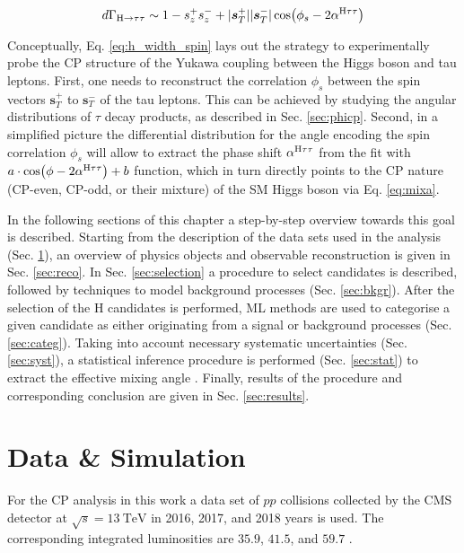 \begin{equation}\label{eq:h_width_spin}
    d\Gamma_{\text{H} \rightarrow \tau\tau} \sim 1 - s^+_zs^-_z + |\boldsymbol{s}_T^+||\boldsymbol{s}_T^-|\cos(\phi_{s}-2\alpha^{\text{H}\tau\tau})
\end{equation}

Conceptually, Eq. \ref{eq:h_width_spin} lays out the strategy to experimentally probe the CP structure of the Yukawa coupling between the Higgs boson and tau leptons. First, one needs to reconstruct the correlation $\phi_{s}$ between the spin vectors $\boldsymbol{s}_T^+$ to $\boldsymbol{s}_T^-$ of the tau leptons. This can be achieved by studying the angular distributions of $\tau$ decay products, as described in Sec. \ref{sec:phicp}. Second, in a simplified picture the differential distribution for the angle encoding the spin correlation $\phi_{s}$ will allow to extract the phase shift $\alpha^{\text{H}\tau\tau}$ from the fit with $a\cdot\cos(\phi - 2\alpha^{\text{H}\tau\tau})+b$ function, which in turn directly points to the CP nature (CP-even, CP-odd, or their mixture) of the SM Higgs boson via Eq. \ref{eq:mixa}. 

In the following sections of this chapter a step-by-step overview towards this goal is described. Starting from the description of the data sets used in the analysis (Sec. \ref{sec:samples}), an overview of physics objects and observable reconstruction is given in Sec. \ref{sec:reco}. In Sec. \ref{sec:selection} a procedure to select \htt candidates is described, followed by techniques to model background processes (Sec. \ref{sec:bkgr}). After the selection of the H candidates is performed, ML methods are used to categorise a given candidate as either originating from a signal or background processes (Sec. \ref{sec:categ}). Taking into account necessary systematic uncertainties (Sec. \ref{sec:syst}), a statistical inference procedure is performed (Sec. \ref{sec:stat}) to extract the effective mixing angle \mixa. Finally, results of the procedure and corresponding conclusion are given in Sec. \ref{sec:results}. 

\section{Data \& Simulation}\label{sec:samples}
For the CP analysis in this work a data set of $pp$ collisions collected by the CMS detector at $\sqrt{s}=13~\text{TeV}$ in 2016, 2017, and 2018 years is used. The corresponding integrated luminosities are $35.9$, $41.5$, and $59.7$ \fbi.


